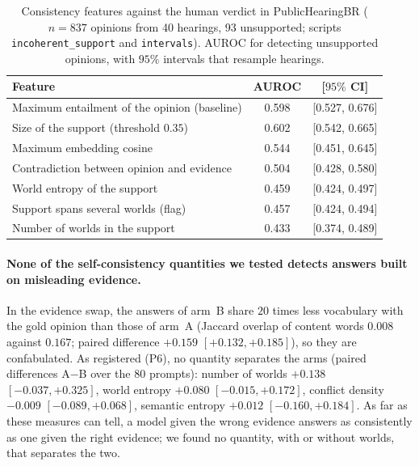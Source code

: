 \documentclass[english]{desafiokunumi}
\theoremstyle{definition}
\theoremstyle{remark}
\begin{document}
\begin{table}[ht]
  \centering
  \caption{Consistency features against the human verdict in PublicHearingBR
  ($n=837$ opinions from 40 hearings, 93 unsupported; scripts \texttt{incoherent\_support} and
  \texttt{intervals}). AUROC for detecting unsupported opinions, with $95\%$ intervals
  that resample hearings.}
  \label{tab:h4}
  \small
  \begin{tabular}{@{}lcc@{}}
    \toprule
    \textbf{Feature} & \textbf{AUROC} & [$95\%$ CI] \\
    \midrule
    Maximum entailment of the opinion (baseline)  & 0.598 & [0.527, 0.676] \\
    Size of the support (threshold $0.35$)         & 0.602 & [0.542, 0.665] \\
    Maximum embedding cosine                       & 0.544 & [0.451, 0.645] \\
    Contradiction between opinion and evidence     & 0.504 & [0.428, 0.580] \\
    World entropy of the support                   & 0.459 & [0.424, 0.497] \\
    Support spans several worlds (flag)            & 0.457 & [0.424, 0.494] \\
    Number of worlds in the support                & 0.433 & [0.374, 0.489] \\
    \bottomrule
  \end{tabular}
\end{table}

\paragraph{None of the self-consistency quantities we tested detects answers
built on misleading evidence.} In the evidence swap, the answers of arm~B share $20$ times less
vocabulary with the gold opinion than those of arm~A (Jaccard overlap of
content words $0.008$ against $0.167$; paired difference $+0.159$
$[+0.132, +0.185]$), so they are confabulated. As registered (P6), no quantity
separates the arms (paired differences A$-$B over the 80 prompts): number of
worlds $+0.138$ $[-0.037, +0.325]$, world entropy $+0.080$ $[-0.015, +0.172]$,
conflict density $-0.009$ $[-0.089, +0.068]$, semantic entropy $+0.012$
$[-0.160, +0.184]$. As far as these measures can tell, a model given the wrong
evidence answers as consistently as one given the right evidence; we found no
quantity, with or without worlds, that separates the two.
\end{document}
